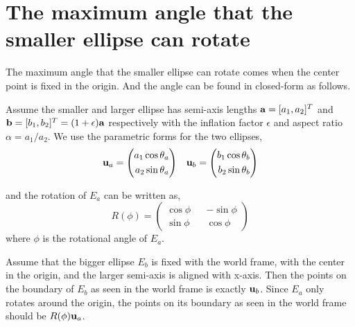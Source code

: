 \documentclass{article}
\begin{document}
\section{The maximum angle that the smaller ellipse can rotate}
\label{apx:max_angle}
The maximum angle that the smaller ellipse can rotate comes when the center point is fixed in the origin. And the angle can be found in closed-form as follows.

Assume the smaller and larger ellipse has semi-axis lengths ${\bf a}=[a_1,a_2]^T$ and ${\bf b}=[b_1,b_2]^T=(1+\epsilon){\bf a}$ respectively with the inflation factor $\epsilon$ and aspect ratio $\alpha=a_1/a_2$. We use the parametric forms for the two ellipses,
\begin{equation}
\begin{aligned}
{\bf u}_a = \left( 
\begin{aligned}
a_1 \cos \theta_a\\
a_2 \sin \theta_a
\end{aligned}
\right) &&
{\bf u}_b = \left( 
\begin{aligned}
b_1 \cos \theta_b\\
b_2 \sin \theta_b
\end{aligned}
\right)
\end{aligned}
\end{equation}

and the rotation of $E_a$ can be written as,
\begin{equation}
R(\phi) = \left(
\begin{aligned}
\cos\phi && -\sin\phi\\
\sin\phi && \cos\phi
\end{aligned}\right)
\end{equation}
where $\phi$ is the rotational angle of $E_a$.

Assume that the bigger ellipse $E_b$ is fixed with the world frame, with the center in the origin, and the larger semi-axis is aligned with x-axis. Then the points on the boundary of $E_b$ as seen in the world frame is exactly ${\bf u}_b$. Since $E_a$ only rotates around the origin, the points on its boundary as seen in the world frame should be $R(\phi) {\bf u}_a$.
\end{document}
